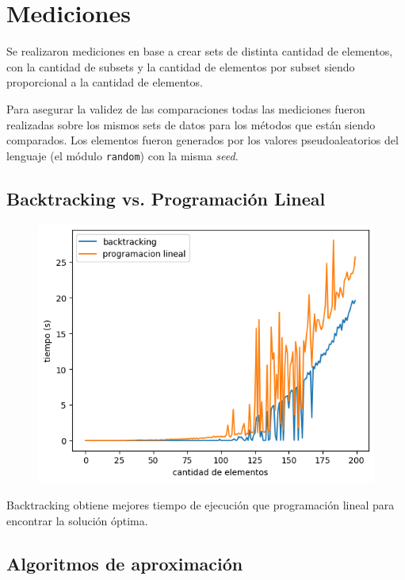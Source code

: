 \section{Mediciones}

Se realizaron mediciones en base a crear sets de distinta cantidad de
elementos, con la cantidad de subsets y la cantidad de elementos por subset
siendo proporcional a la cantidad de elementos.

Para asegurar la validez de las comparaciones todas las mediciones fueron
realizadas sobre los mismos sets de datos para los m\'etodos que est\'an siendo
comparados. Los elementos fueron generados por los valores pseudoaleatorios del
lenguaje (el m\'odulo \texttt{random}) con la misma \textit{seed}.

\subsection{Backtracking vs. Programación Lineal}

\begin{figure}[H]
    \centering
    \includegraphics[width=1\textwidth]{img/backvslp.png}
\end{figure}

Backtracking obtiene mejores tiempo de ejecución que programación lineal para
encontrar la solución óptima.

\subsection{Algoritmos de aproximaci\'on}

